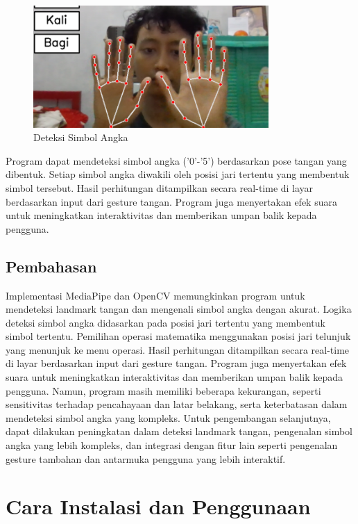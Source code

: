 \documentclass[11pt,a4paper]{article}
\begin{document}
    \begin{figure}[H]
        \centering
        \includegraphics[width=0.8\textwidth]{Figure/number_detection.png}
        \caption{Deteksi Simbol Angka}
        \label{fig:number_detection}
    \end{figure}
    Program dapat mendeteksi simbol angka ('0'-'5') berdasarkan pose tangan yang dibentuk. Setiap simbol angka diwakili oleh posisi jari tertentu yang membentuk simbol tersebut. Hasil perhitungan ditampilkan secara real-time di layar berdasarkan input dari gesture tangan. Program juga menyertakan efek suara untuk meningkatkan interaktivitas dan memberikan umpan balik kepada pengguna.

    \subsection{Pembahasan}

    Implementasi MediaPipe dan OpenCV memungkinkan program untuk mendeteksi landmark tangan dan mengenali simbol angka dengan akurat. Logika deteksi simbol angka didasarkan pada posisi jari tertentu yang membentuk simbol tertentu. Pemilihan operasi matematika menggunakan posisi jari telunjuk yang menunjuk ke menu operasi. Hasil perhitungan ditampilkan secara real-time di layar berdasarkan input dari gesture tangan. Program juga menyertakan efek suara untuk meningkatkan interaktivitas dan memberikan umpan balik kepada pengguna. Namun, program masih memiliki beberapa kekurangan, seperti sensitivitas terhadap pencahayaan dan latar belakang, serta keterbatasan dalam mendeteksi simbol angka yang kompleks. Untuk pengembangan selanjutnya, dapat dilakukan peningkatan dalam deteksi landmark tangan, pengenalan simbol angka yang lebih kompleks, dan integrasi dengan fitur lain seperti pengenalan gesture tambahan dan antarmuka pengguna yang lebih interaktif.

\newpage
\section{Cara Instalasi dan Penggunaan}
\end{document}
